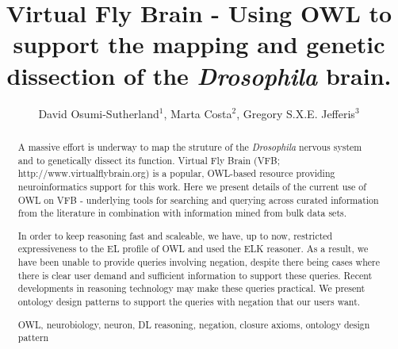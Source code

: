 \documentclass[runningheads,a4paper]{llncs}
\newcommand{\keywords}[1]{\par\addvspace\baselineskip
\noindent\keywordname\enspace\ignorespaces#1}
\begin{document}
\mainmatter  %

\title{Virtual Fly Brain - Using OWL to support the mapping and
  genetic dissection of the \textit{Drosophila} brain.}


%
%
\author{David Osumi-Sutherland$^1$, Marta Costa$^2$, Gregory S.X.E. Jefferis$^3$}

%


%
%

\toctitle{}
\tocauthor{}
\maketitle


\begin{abstract}
A massive effort is underway to map the struture of the \textit{Drosophila}
nervous system and to genetically dissect its function. Virtual Fly
Brain (VFB; http://www.virtualflybrain.org) is a popular, OWL-based resource
providing neuroinformatics support for this work.  Here we present
details of the current use of OWL on VFB  - underlying tools for
searching and querying across curated information from the literature
in combination with information mined from bulk data sets. 

In order to keep reasoning fast and scaleable, we have, up to now, restricted
expressiveness to the EL profile of OWL and used the ELK reasoner. As a result,
we have been unable to provide queries involving negation, despite
there being cases where there is clear
user demand and sufficient information to support these
queries. Recent developments in reasoning technology may 
make these queries practical. We present ontology design patterns to 
support the queries with negation that our users want.

\keywords{OWL, neurobiology, neuron, DL reasoning, negation, closure
  axioms, ontology design pattern}
\end{abstract}
\end{document}

